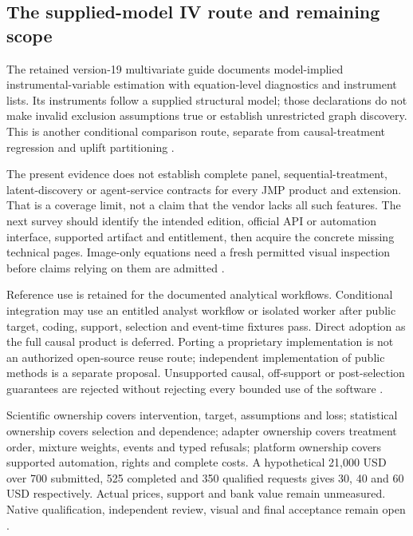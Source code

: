 \subsection{The supplied-model IV route and remaining scope}
The retained version-19 multivariate guide documents model-implied
instrumental-variable estimation with equation-level diagnostics and
instrument lists. Its instruments follow a supplied structural model;
those declarations do not make invalid exclusion assumptions true or
establish unrestricted graph discovery. This is another conditional
comparison route, separate from causal-treatment regression and uplift
partitioning \cite{exec13_ivrd_jmp}.

The present evidence does not establish complete panel, sequential-treatment,
latent-discovery or agent-service contracts for every JMP product and
extension. That is a coverage limit, not a claim that the vendor lacks all
such features. The next survey should identify the intended edition,
official API or automation interface, supported artifact and entitlement,
then acquire the concrete missing technical pages. Image-only equations
need a fresh permitted visual inspection before claims relying on them
are admitted \cite{exec24_jmp_choice}.

Reference use is retained for the documented analytical workflows.
Conditional integration may use an entitled analyst workflow or isolated
worker after public target, coding, support, selection and event-time
fixtures pass. Direct adoption as the full causal product is deferred.
Porting a proprietary implementation is not an authorized open-source
reuse route; independent implementation of public methods is a separate
proposal. Unsupported causal, off-support or post-selection guarantees
are rejected without rejecting every bounded use of the software
\cite{exec24_jmp_choice}.

Scientific ownership covers intervention, target, assumptions and loss;
statistical ownership covers selection and dependence; adapter ownership
covers treatment order, mixture weights, events and typed refusals; platform
ownership covers supported automation, rights and complete costs. A
hypothetical 21,000 USD over 700 submitted, 525 completed and 350
qualified requests gives 30, 40 and 60 USD respectively. Actual prices,
support and bank value remain unmeasured. Native qualification, independent
review, visual and final acceptance remain open
\cite{exec24_jmp_choice}.
